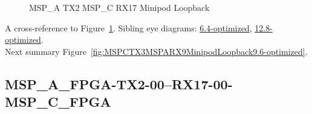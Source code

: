 \begin{figure}[h]
\begin{subfigure}{0.33\textwidth}
\hyperref[sec:MSPAFPGATX206RX1706MSPCFPGA9.6-optimized]{}
\end{subfigure}\hspace*{\fill}
\begin{subfigure}{0.33\textwidth}
\hyperref[sec:MSPAFPGATX207RX1707MSPCFPGA9.6-optimized]{}
\end{subfigure}\hspace*{\fill}
\begin{subfigure}{0.33\textwidth}
\hyperref[sec:MSPAFPGATX208RX1708MSPCFPGA9.6-optimized]{}
\end{subfigure}

\begin{subfigure}{0.33\textwidth}
\hyperref[sec:MSPAFPGATX209RX1709MSPCFPGA9.6-optimized]{}
\end{subfigure}\hspace*{\fill}
\begin{subfigure}{0.33\textwidth}
\hyperref[sec:MSPAFPGATX210RX1710MSPCFPGA9.6-optimized]{}
\end{subfigure}\hspace*{\fill}
\begin{subfigure}{0.33\textwidth}
\hyperref[sec:MSPAFPGATX211RX1711MSPCFPGA9.6-optimized]{}
\end{subfigure}

\caption{MSP\_A TX2 MSP\_C RX17 Minipod Loopback} \label{fig:MSPATX2MSPCRX17MinipodLoopback9.6-optimized}
\end{figure}

A cross-reference to Figure~\ref{fig:MSPATX2MSPCRX17MinipodLoopback9.6-optimized}.
Sibling eye diagrams: \hyperref[sec:MSPATX2MSPCRX17MinipodLoopback6.4-optimized]{6.4-optimized}, \hyperref[sec:MSPATX2MSPCRX17MinipodLoopback12.8-optimized]{12.8-optimized}. \\
Next summary Figure~\ref{fig:MSPCTX3MSPARX9MinipodLoopback9.6-optimized}.
\clearpage
% 
\subsection{MSP\_A\_FPGA-TX2-00--RX17-00-MSP\_C\_FPGA}\label{sec:MSPAFPGATX200RX1700MSPCFPGA9.6-optimized}

